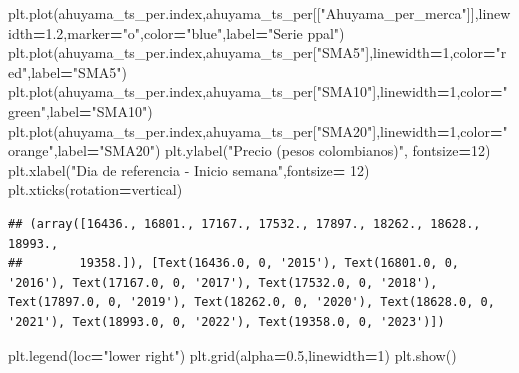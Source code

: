 \documentclass[
]{book}
\newenvironment{Shaded}{\begin{snugshade}}{\end{snugshade}}
\newcommand{\DecValTok}[1]{\textcolor[rgb]{0.00,0.00,0.81}{#1}}
\newcommand{\FloatTok}[1]{\textcolor[rgb]{0.00,0.00,0.81}{#1}}
\newcommand{\NormalTok}[1]{#1}
\newcommand{\OperatorTok}[1]{\textcolor[rgb]{0.81,0.36,0.00}{\textbf{#1}}}
\newcommand{\StringTok}[1]{\textcolor[rgb]{0.31,0.60,0.02}{#1}}
\begin{document}
\begin{Shaded}
\begin{Highlighting}[]

\NormalTok{plt.plot(ahuyama\_ts\_per.index,ahuyama\_ts\_per[[}\StringTok{"Ahuyama\_per\_merca"}\NormalTok{]],linewidth}\OperatorTok{=}\FloatTok{1.2}\NormalTok{,marker}\OperatorTok{=}\StringTok{"o"}\NormalTok{,color}\OperatorTok{=}\StringTok{"blue"}\NormalTok{,label}\OperatorTok{=}\StringTok{"Serie ppal"}\NormalTok{)}
\NormalTok{plt.plot(ahuyama\_ts\_per.index,ahuyama\_ts\_per[}\StringTok{"SMA5"}\NormalTok{],linewidth}\OperatorTok{=}\DecValTok{1}\NormalTok{,color}\OperatorTok{=}\StringTok{"red"}\NormalTok{,label}\OperatorTok{=}\StringTok{"SMA5"}\NormalTok{)}
\NormalTok{plt.plot(ahuyama\_ts\_per.index,ahuyama\_ts\_per[}\StringTok{"SMA10"}\NormalTok{],linewidth}\OperatorTok{=}\DecValTok{1}\NormalTok{,color}\OperatorTok{=}\StringTok{"green"}\NormalTok{,label}\OperatorTok{=}\StringTok{"SMA10"}\NormalTok{)}
\NormalTok{plt.plot(ahuyama\_ts\_per.index,ahuyama\_ts\_per[}\StringTok{"SMA20"}\NormalTok{],linewidth}\OperatorTok{=}\DecValTok{1}\NormalTok{,color}\OperatorTok{=}\StringTok{"orange"}\NormalTok{,label}\OperatorTok{=}\StringTok{"SMA20"}\NormalTok{)}
\NormalTok{plt.ylabel(}\StringTok{"Precio (pesos colombianos)"}\NormalTok{, fontsize}\OperatorTok{=}\DecValTok{12}\NormalTok{)}
\NormalTok{plt.xlabel(}\StringTok{"Dia de referencia {-} Inicio semana"}\NormalTok{,fontsize}\OperatorTok{=} \DecValTok{12}\NormalTok{)}
\NormalTok{plt.xticks(rotation}\OperatorTok{=}\StringTok{\textquotesingle{}vertical\textquotesingle{}}\NormalTok{)}
\end{Highlighting}
\end{Shaded}

\begin{verbatim}
## (array([16436., 16801., 17167., 17532., 17897., 18262., 18628., 18993.,
##        19358.]), [Text(16436.0, 0, '2015'), Text(16801.0, 0, '2016'), Text(17167.0, 0, '2017'), Text(17532.0, 0, '2018'), Text(17897.0, 0, '2019'), Text(18262.0, 0, '2020'), Text(18628.0, 0, '2021'), Text(18993.0, 0, '2022'), Text(19358.0, 0, '2023')])
\end{verbatim}

\begin{Shaded}
\begin{Highlighting}[]
\NormalTok{plt.legend(loc}\OperatorTok{=}\StringTok{"lower right"}\NormalTok{)}
\NormalTok{plt.grid(alpha}\OperatorTok{=}\FloatTok{0.5}\NormalTok{,linewidth}\OperatorTok{=}\DecValTok{1}\NormalTok{)}
\NormalTok{plt.show()}
\end{Highlighting}
\end{Shaded}
\end{document}
